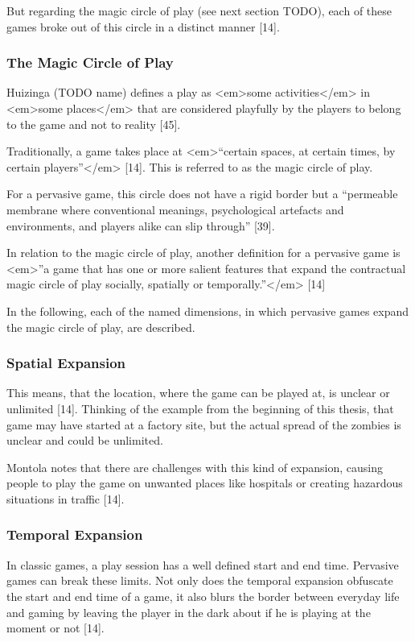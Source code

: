 But regarding the magic circle of play (see next section TODO), each of these games broke out of this circle in a distinct manner [14].

\subsubsection{The Magic Circle of Play}
Huizinga (TODO name) defines a play as <em>some activities</em> in <em>some places</em> that are considered playfully by the players to belong to the game and not to reality [45].

Traditionally, a game takes place at <em>“certain spaces, at certain times, by certain players”</em> [14]. This is referred to as the magic circle of play.

For a pervasive game, this circle does not have a rigid border but a “permeable membrane where conventional meanings, psychological artefacts and environments, and players alike can slip through” [39].

In relation to the magic circle of play, another definition for a pervasive game is <em>”a game that has one or more salient features that expand the contractual magic circle of play socially, spatially or temporally.”</em> [14]

In the following, each of the named dimensions, in which pervasive games expand the magic circle of play, are described.

\subsubsection{Spatial Expansion}
This means, that the location, where the game can be played at, is unclear or unlimited [14]. Thinking of the example from the beginning of this thesis, that game may have started at a factory site, but the actual spread of the zombies is unclear and could be unlimited.

Montola notes that there are challenges with this kind of expansion, causing people to play the game on unwanted places like hospitals or creating hazardous situations in traffic [14].

\subsubsection{Temporal Expansion}
In classic games, a play session has a well defined start and end time. Pervasive games can break these limits. Not only does the temporal expansion obfuscate the start and end time of a game, it also blurs the border between everyday life and gaming by leaving the player in the dark about if he is playing at the moment or not [14].

